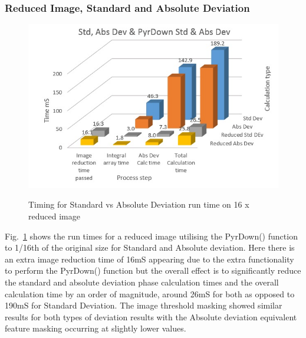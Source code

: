 \documentclass[journal]{IEEEtran}
\begin{document}
\subsubsection*{Reduced Image, Standard and Absolute Deviation}
 \begin{figure}[htbp]
  \centering
    \caption{Timing for Standard vs Absolute Deviation run time on 16 x reduced image}
    \includegraphics[width=\columnwidth]{Full+RedDevTiming.jpg}
  \label{fig:RedStdDevTime}
\end{figure}
Fig.~\ref{fig:RedStdDevTime} shows the run times for a reduced image utilising the PyrDown() function to 1\slash 16th of the original size for Standard and Absolute deviation. Here there is an extra image reduction time of 16mS appearing due to the extra functionality to perform the PyrDown() function but the overall effect is to significantly reduce the standard  and absolute deviation phase calculation times and the overall calculation time by an order of magnitude, around 26mS for both as opposed to 190mS for Standard Deviation. The image threshold masking showed similar results for both types of deviation results with the Absolute deviation equivalent feature masking occurring at slightly lower values. \\
\end{document}
